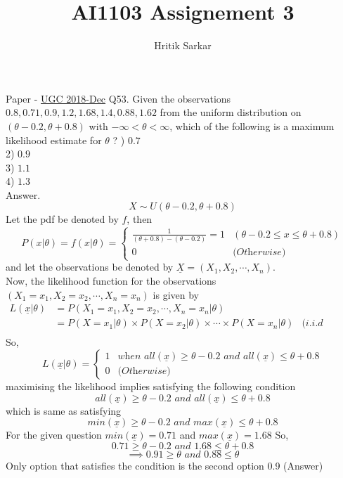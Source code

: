 \documentclass{article}
\title{AI1103 Assignement 3}
\author{Hritik Sarkar}
\theoremstyle{remark}
\renewcommand{\vec}[1]{\underline{#1}}
\begin{document}
\maketitle
Paper - \href{https://github.com/gadepall/papers/blob/master/ugc/math/dec-math-set-a-2018.pdf}{UGC 2018-Dec}
\newline
\newline
Q53. Given the observations $0.8,0.71,0.9,1.2,1.68,1.4,0.88,1.62$ from the uniform distribution on $(\theta-0.2,\theta+0.8)$ with $-\infty< \theta < \infty$, which of the following is a maximum likelihood estimate for $\theta$ ?
) $0.7$ \\
2) $0.9$ \\
3) $1.1$ \\
4) $1.3$ \\
\newline
Answer.
\[
    X \sim U(\theta-0.2,\theta+0.8)
\]
Let the pdf be denoted by $f$, then
\[
    P(x|\theta) = f(x|\theta) = 
    \begin{cases}
     \frac{1}{(\theta+0.8)-(\theta-0.2)} = 1 &(\theta-0.2 \le x \le \theta+0.8)
     \\ 0 &\textit{(Otherwise)}
\end{cases}
\]
and let the observations be denoted by $\vec{X}=(X_1,X_2,\cdots,X_n)$. \\
\newline
Now, the likelihood function for the observations $(X_1=x_1,X_2=x_2,\cdots,X_n=x_n)$ is given by\\
\begin{align*}
    L(\vec{x}|\theta)&=P(X_1=x_1,X_2=x_2,\cdots,X_n=x_n | \theta)\\
    &= P(X = x_1 |\theta)\times P(X=x_2 |\theta) \times  \cdots \times P(X = x_n |\theta) &\textit{(i.i.d assumption)}\\ 
\end{align*}
So,
\[
L(\vec{x}|\theta) = \begin{cases}
 1 &\textit{when $all(\vec{x}) \ge \theta-0.2$ and $all(\vec{x}) \le \theta+0.8$} \\
 0 &\textit{(Otherwise)}
\end{cases}
\]
\newline
maximising the likelihood implies satisfying the following condition
\[
    all(\vec{x}) \ge \theta-0.2 \textit{ and } all(\vec{x}) \le \theta+0.8
\]
which is same as satisfying
\[
    min(\vec{x}) \ge \theta-0.2 \textit{ and } max(\vec{x}) \le \theta+0.8
\]
For the given question $min(\vec{x}) = 0.71$ and $max(\vec{x}) = 1.68$
\newline
So,
\[
    0.71 \ge \theta-0.2 \textit{ and } 1.68 \le \theta+0.8
\]
\[
\implies 0.91 \ge \theta \textit{ and } 0.88 \le \theta
\]
Only option that satisfies the condition is the second option 0.9 (Answer)
\end{document}
